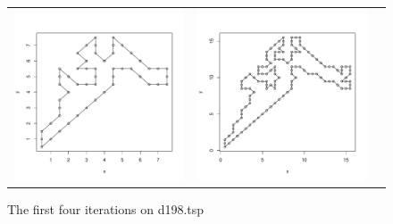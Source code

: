 \begin{figure}[t]
\begin{center}
\begin{tabular}{ccc}
\includegraphics[scale=0.25]{fig/it8.pdf} &
\includegraphics[scale=0.25]{fig/it16.pdf}
\end{tabular}
\caption{The first four iterations on d198.tsp}
\label{fig:iterations}
\end{center}
\end{figure}
